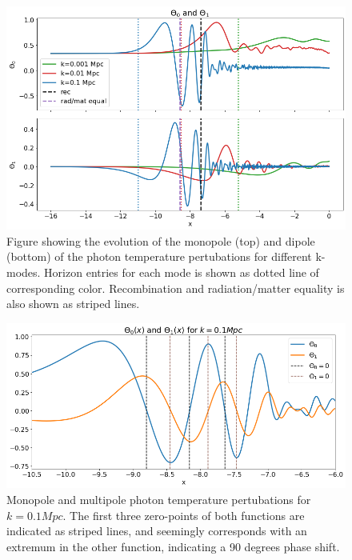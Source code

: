 \documentclass[10pt, a4paper]{article}
\begin{document}
\begin{figure}[H]
    \centering
    \includegraphics[scale=0.45]{../m3_figs/thetas.png}
    \caption{Figure showing the evolution of the monopole (top) and dipole (bottom) of the photon temperature pertubations for different k-modes. Horizon entries for each mode is shown as dotted line of corresponding color. Recombination and radiation/matter equality is also shown as striped lines.}
    \label{}
\end{figure}

\begin{figure}[H]
    \centering
    \includegraphics[scale=0.45]{../m3_figs/Theta0_zoomed.png}
    \caption{Monopole and multipole photon temperature pertubations for $k=0.1 Mpc$. The first three zero-points of both functions are indicated as striped lines, and seemingly corresponds with an extremum in the other function, indicating a 90 degrees phase shift.}
    \label{}
\end{figure}












\end{document}
